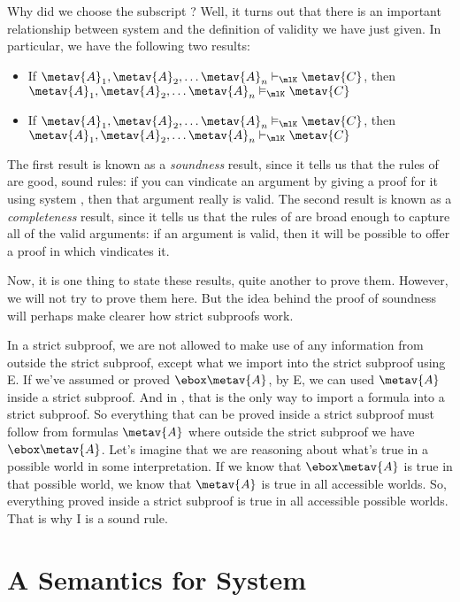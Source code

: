 Why did we choose the subscript \mlK? Well, it turns out that there is an important relationship between system \mlK{} and the definition of validity we have just given. In particular, we have the following two results:
\begin{itemize}
	\item If $\metav{A}_1,\metav{A}_2, \dots \metav{A}_n\proves_\mlK\metav{C}$, then $\metav{A}_1,\metav{A}_2, \dots \metav{A}_n\entails_\mlK\metav{C}$
	\item If $\metav{A}_1,\metav{A}_2, \dots \metav{A}_n\entails_\mlK\metav{C}$, then $\metav{A}_1,\metav{A}_2, \dots \metav{A}_n\proves_\mlK\metav{C}$
\end{itemize}
The first result is known as a \emph{soundness} result, since it tells us that the rules of \mlK{} are good, sound rules: if you can vindicate an argument by giving a proof for it using system \mlK, then that argument really is valid. The second result is known as a \emph{completeness} result, since it tells us that the rules of \mlK{} are broad enough to capture all of the valid arguments: if an argument is valid, then it will be possible to offer a proof in \mlK{} which vindicates it.

Now, it is one thing to state these results, quite another to prove them. However, we will not try to prove them here. But the idea behind the proof of soundness will perhaps make clearer how strict subproofs work. 

In a strict subproof, we are not allowed to make use of any information from outside the strict subproof, except what we import into the strict subproof using \ebox E. If we've assumed or proved $\ebox \metav{A}$, by \ebox E, we can used $\metav{A}$ inside a strict subproof. And in \mlK, that is the only way to import a formula into a strict subproof. So everything that can be proved inside a strict subproof must follow from formulas $\metav{A}$ where outside the strict subproof we have $\ebox \metav{A}$. Let's imagine that we are reasoning about what's true in a possible world in some interpretation. If we know that $\ebox\metav{A}$ is true in that possible world, we know that $\metav{A}$ is true in all accessible worlds. So, everything proved inside a strict subproof is true in all accessible possible worlds. That is why \ebox I is a sound rule.

\section{A Semantics for System \mlT}
\label{SemanticsT}

